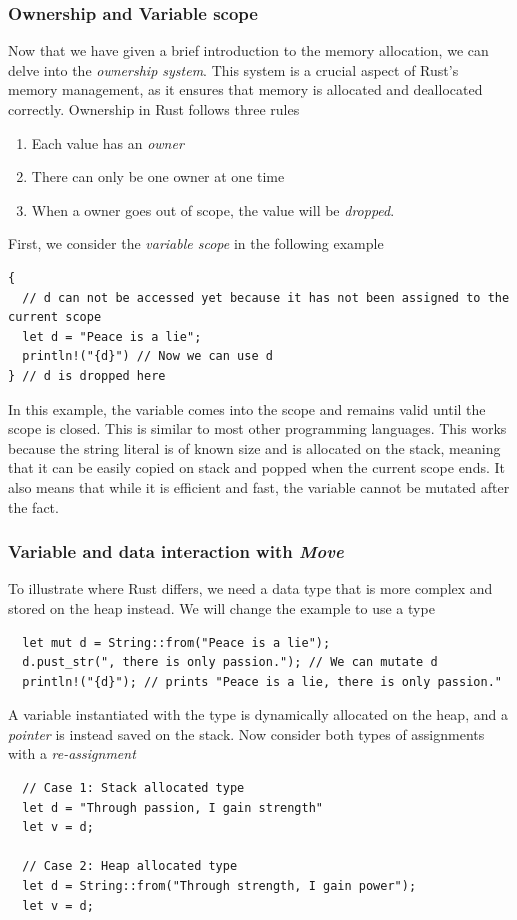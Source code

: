 \documentclass[11pt]{report}
\theoremstyle{definition}
\theoremstyle{plain}
\begin{document}
\subsubsection{Ownership and Variable scope}
Now that we have given a brief introduction to the memory allocation, we can delve into the \textit{ownership system}. This system is a crucial aspect of Rust's memory management, as it ensures that memory is allocated and deallocated correctly. Ownership in Rust follows three rules
\begin{enumerate}[parsep=0pt, itemsep=0pt]
  \item Each value has an \textit{owner}
  \item There can only be one owner at one time
  \item When a owner goes out of scope, the value will be \textit{dropped}.
\end{enumerate}
First, we consider the \textit{variable scope} in the following example
\begin{verbatim}
{
  // d can not be accessed yet because it has not been assigned to the current scope
  let d = "Peace is a lie";
  println!("{d}") // Now we can use d
} // d is dropped here
\end{verbatim}
In this example, the variable  comes into the scope and remains valid until the scope is closed. This is similar to most other programming languages. This works because the string literal  is of known size and is allocated on the stack, meaning that it can be easily copied on stack and popped when the current scope ends. It also means that while it is efficient and fast, the variable  cannot be mutated after the fact.

\subsubsection{Variable and data interaction with \textit{Move}}

To illustrate where Rust differs, we need a data type that is more complex and stored on the heap instead. We will change the example to use a  type
\begin{verbatim}
  let mut d = String::from("Peace is a lie");
  d.pust_str(", there is only passion."); // We can mutate d
  println!("{d}"); // prints "Peace is a lie, there is only passion."
\end{verbatim}
A variable instantiated with the  type is dynamically allocated on the heap, and a \textit{pointer} is instead saved on the stack. Now consider both types of assignments with a \textit{re-assignment}
\begin{verbatim}
  // Case 1: Stack allocated type
  let d = "Through passion, I gain strength"
  let v = d;

  // Case 2: Heap allocated type
  let d = String::from("Through strength, I gain power");
  let v = d;
\end{verbatim}
\end{document}
